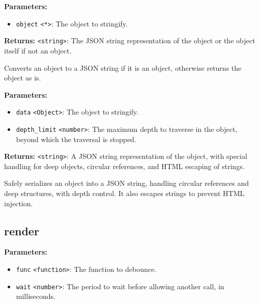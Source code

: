 \documentclass[12pt,a4paper]{article}
\begin{document}
\noindent \textbf{Parameters:}
\begin{itemize}
  \item \texttt{object} \texttt{<*>}: The object to stringify.
\end{itemize}

\noindent \textbf{Returns:} \texttt{<string>}: The JSON string representation of the object or the object itself if not an object.

\noindent Converts an object to a JSON string if it is an object, otherwise returns the object as is.

\vspace{5mm}
\noindent {}


\noindent \textbf{Parameters:}
\begin{itemize}
  \item \texttt{data} \texttt{<Object>}: The object to stringify.
  \item \texttt{depth\_limit} \texttt{<number>}: The maximum depth to traverse in the object, beyond which the traversal is stopped.
\end{itemize}

\noindent \textbf{Returns:} \texttt{<string>}: A JSON string representation of the object, with special handling for deep objects, circular references, and HTML escaping of strings.

\noindent Safely serializes an object into a JSON string, handling circular references and deep structures, with depth control.
It also escapes strings to prevent HTML injection.


\subsection{render}
\vspace{5mm}
\noindent {}


\noindent \textbf{Parameters:}
\begin{itemize}
  \item \texttt{func} \texttt{<function>}: The function to debounce.
  \item \texttt{wait} \texttt{<number>}: The period to wait before allowing another call, in milliseconds.
\end{itemize}
\end{document}
